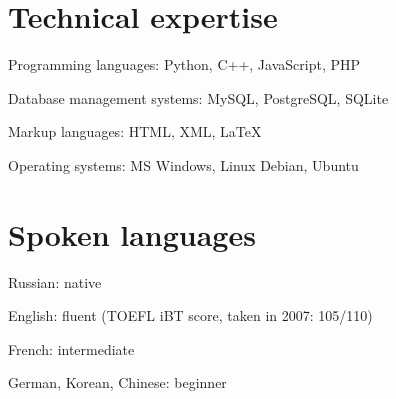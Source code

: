 \documentclass[letterpaper]{article}
\renewenvironment{itemize}{
  \begin{list}{}{
    \setlength{\leftmargin}{0.6em}
  }
}{
  \end{list}
}
\begin{document}
\section*{Technical expertise}
\begin{itemize}
\item Programming languages: Python, C++, JavaScript, PHP
\item Database management systems: MySQL, PostgreSQL, SQLite
\item Markup languages: HTML, XML, LaTeX
\item Operating systems: MS Windows, Linux Debian, Ubuntu
\end{itemize}

\section*{Spoken languages}
\begin{itemize}
\item Russian: native
\item English: fluent (TOEFL iBT score, taken in 2007: 105/110)
\item French: intermediate
\item German, Korean, Chinese: beginner
\end{itemize}
\end{document}
